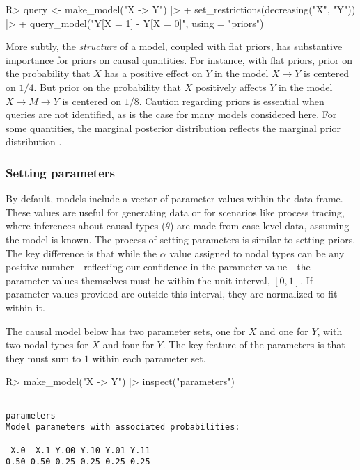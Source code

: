 \documentclass[
  11pt,
  article]{jss}
\renewcommand{\texttt}[1]{\code{#1}}
\begin{document}
\begin{CodeInput}
R> query <- make_model("X -> Y") |> 
+    set_restrictions(decreasing("X", "Y")) |>
+    query_model("Y[X = 1] - Y[X = 0]", using = "priors")
\end{CodeInput}

More subtly, the \emph{structure} of a model, coupled with flat priors,
has substantive importance for priors on causal quantities. For
instance, with flat priors, prior on the probability that \(X\) has a
positive effect on \(Y\) in the model \(X \rightarrow Y\) is centered on
\(1/4\). But prior on the probability that \(X\) positively affects
\(Y\) in the model \(X \rightarrow M \rightarrow Y\) is centered on
\(1/8\). Caution regarding priors is essential when queries are not
identified, as is the case for many models considered here. For some
quantities, the marginal posterior distribution reflects the marginal
prior distribution \citep{poirier_revising_1998}.

\subsubsection{Setting parameters}\label{parameters}

By default, models include a vector of parameter values within the
\texttt{parameters\_df} data frame. These values are useful for
generating data or for scenarios like process tracing, where inferences
about causal types (\(\theta\)) are made from case-level data, assuming
the model is known. The process of setting parameters is similar to
setting priors. The key difference is that while the \(\alpha\) value
assigned to nodal types can be any positive number---reflecting our
confidence in the parameter value---the parameter values themselves must
be within the unit interval, \([0,1]\). If parameter values provided are
outside this interval, they are normalized to fit within it.

The causal model below has two parameter sets, one for \(X\) and one for
\(Y\), with two nodal types for \(X\) and four for \(Y\). The key
feature of the parameters is that they must sum to \(1\) within each
parameter set.

\begin{CodeInput}
R> make_model("X -> Y") |> inspect("parameters")
\end{CodeInput}

\begin{verbatim}

parameters
Model parameters with associated probabilities: 

 X.0  X.1 Y.00 Y.10 Y.01 Y.11 
0.50 0.50 0.25 0.25 0.25 0.25 
\end{verbatim}
\end{document}
